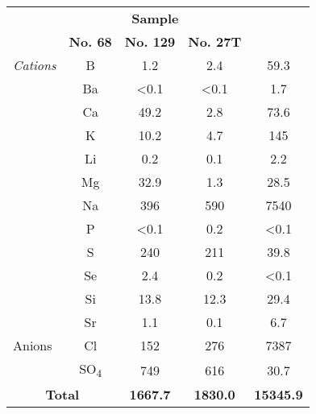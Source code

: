 \begin{tabular}{|p{6em} c | c | c | c |}
    \hline
    \rowcolor{bluepoli!40}
    \multicolumn{2}{|c|}{} & \multicolumn{3}{c|}{\textbf{Sample}} \T\B \\
    \rowcolor{bluepoli!40}
    \multicolumn{2}{|c|}{\textbf{Species}} & \textbf{No. 68} & \textbf{No. 129} & \textbf{No. 27T}\T\B \\
    \hline \hline
    \emph{Cations} & B & 1.2 & 2.4 & 59.3 \T\B\\
     & Ba & <0.1 & <0.1 & 1.7 \T\B \\
     & Ca & 49.2 & 2.8 & 73.6 \T\B \\
     & K & 10.2 & 4.7 & 145 \T\B \\
     & Li & 0.2 & 0.1 & 2.2 \T\B \\
     & Mg & 32.9 & 1.3 & 28.5 \T\B \\ 
     & Na & 396 & 590 & 7540 \T\B \\
     & P & <0.1 & 0.2 & <0.1 \T\B \\
     & S & 240 & 211 & 39.8 \T\B \\
     & Se & 2.4 & 0.2 & <0.1 \T\B \\
     & Si & 13.8 & 12.3 & 29.4 \T\B \\
     & Sr & 1.1 & 0.1 & 6.7 \T\B \\
     \hline
     Anions & Cl & 152 & 276 & 7387 \T\B \\
     & SO\textsubscript{4} & 749 & 616 & 30.7 \T\B \\
    \hline
    \multicolumn{2}{|c|}{\textbf{Total}} & \textbf{1667.7} & \textbf{1830.0} & \textbf{15345.9} \T\B \\
     \hline
\end{tabular}